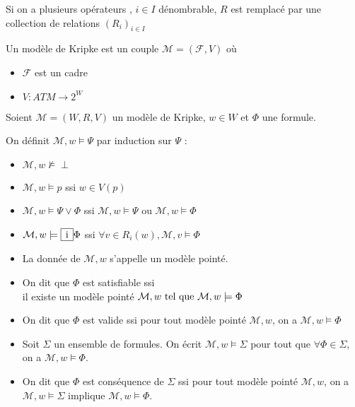 \documentclass[10pt,a4paper]{article}
\newcommand{\F}{\mathcal{F}}
\newcommand{\M}{\mathcal{M}}
\begin{document}
\begin{rem}
 Si on a plusieurs opérateurs , $i \in I$ dénombrable, $R$ est remplacé par une collection de relations $(R_i)_{i \in I}$
\end{rem}

\begin{definition}
 Un modèle de Kripke est un couple $ \M = (\F, V)$ où
\begin{itemize}
 \item $ \F$ est un cadre
 \item $ V : ATM \rightarrow 2^W$
\end{itemize}
\end{definition}

\begin{definition}[$\models$]
 Soient $ \M = (W,R,V)$ un modèle de Kripke, $w \in W$ et $ \Phi$ une formule.

On définit $ \M, w \models \Psi$ par induction sur $ \Psi$ :
\begin{itemize}
 \item $ \M, w \not \models \perp$
 \item $ \M, w \models p$ ssi $w \in V(p)$
 \item $ \M, w \models \Psi \vee \Phi$ ssi $ \M,w \models \Psi$ ou $ \M, w \models \Phi$
 \item $ \M, w \models \fbox{\,i\,} \Phi$ ssi $ \forall v \in R_i(w), \M, v \models \Phi$
\end{itemize}

\end{definition}


\begin{itemize}
 \item La donnée de $ \M, w $ s'appelle un modèle pointé.
 \item On dit que $ \Phi $ est satisfiable ssi \\il existe un modèle pointé $ \M, w  \tq \M, w \models \Phi$
 \item On dit que $ \Phi $ est valide ssi pour tout modèle pointé $\M, w$, on a $\M, w \models \Phi$
 \item Soit $ \Sigma$ un ensemble de formules. On écrit $ \M, w \models \Sigma$ pour tout que $ \forall \Phi \in \Sigma$, on a $\M, w \models \Phi$.
 \item On dit que $ \Phi$ est conséquence de $ \Sigma$ ssi pour tout modèle pointé $ \M, w$, on a $\M, w \models \Sigma$ implique $\M, w \models \Phi$.
\end{itemize}
\end{document}

